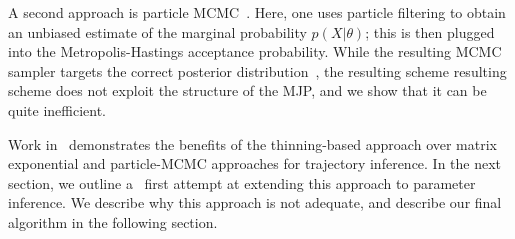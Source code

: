 
A second approach is particle MCMC~\cite{Andrieu10}. Here, one uses 
particle filtering to obtain an unbiased estimate of the marginal 
probability $p(X|\theta)$; this is then plugged into the 
Metropolis-Hastings acceptance probability. While the resulting MCMC 
sampler targets the correct posterior distribution~\cite{Andrieu09}, 
the resulting scheme resulting scheme does not exploit the structure 
of the MJP, and we show that it can be quite inefficient.

Work in~\cite{RaoTeh13, RaoTeh12} demonstrates the benefits of
the thinning-based approach over matrix exponential and particle-MCMC
approaches for trajectory inference. In the next section, we outline
a \naive\  first attempt at extending this approach to parameter inference.
We describe why this approach is not adequate, and describe our
final algorithm in the following section. 

